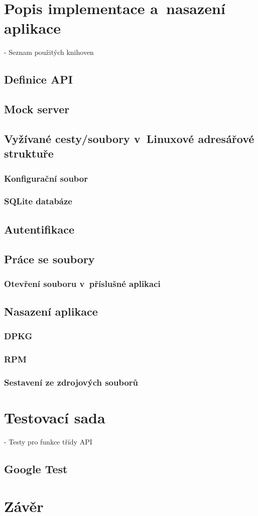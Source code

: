 \cite{Keyring}

\chapter{Popis implementace a nasazení aplikace}

- Seznam použitých knihoven

\section{Definice API}
\section{Mock server}
\section{Vyžívané cesty/soubory v Linuxové adresářové struktuře}
\subsection{Konfigurační soubor}
\subsection{SQLite databáze}
\section{Autentifikace}
\section{Práce se soubory}
\subsection{Otevření souboru v příslušné aplikaci}

\cite{xdg}

\section{Nasazení aplikace}
\subsection{DPKG} %
\subsection{RPM} %
\subsection{Sestavení ze zdrojových souborů}

\chapter{Testovací sada}

- Testy pro funkce třídy API

\section{Google Test}

\chapter{Závěr}



